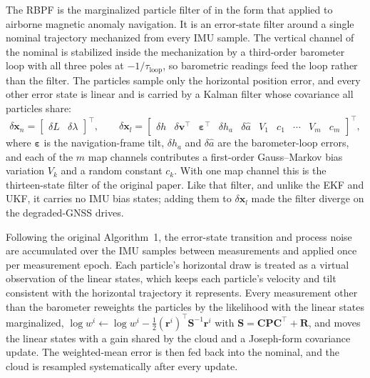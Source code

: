 The RBPF is the marginalized particle filter of \citet{schon2005marginalized} in the form that \citet{canciani2017airborne} applied to airborne magnetic anomaly navigation. It is an error-state filter around a single nominal trajectory mechanized from every IMU sample. The vertical channel of the nominal is stabilized inside the mechanization by a third-order barometer loop with all three poles at \(-1/\tau_\text{loop}\), so barometric readings feed the loop rather than the filter. The particles sample only the horizontal position error, and every other error state is linear and is carried by a Kalman filter whose covariance all particles share:
\begin{equation}
  \delta\mathbf{x}_n = \begin{bmatrix} \delta L & \delta\lambda \end{bmatrix}^\top, \qquad
  \delta\mathbf{x}_l = \begin{bmatrix} \delta h & \delta\mathbf{v}^\top & \bm{\varepsilon}^\top & \delta h_a & \delta\hat{a} & V_1 & c_1 & \cdots & V_m & c_m \end{bmatrix}^\top,
  \label{eqn:rbpf-partition}
\end{equation}
where \(\bm{\varepsilon}\) is the navigation-frame tilt, \(\delta h_a\) and \(\delta\hat{a}\) are the barometer-loop errors, and each of the \(m\) map channels contributes a first-order Gauss--Markov bias variation \(V_k\) and a random constant \(c_k\). With one map channel this is the thirteen-state filter of the original paper. Like that filter, and unlike the EKF and UKF, it carries no IMU bias states; adding them to \(\delta\mathbf{x}_l\) made the filter diverge on the degraded-GNSS drives.

Following the original Algorithm~1, the error-state transition and process noise are accumulated over the IMU samples between measurements and applied once per measurement epoch. Each particle's horizontal draw is treated as a virtual observation of the linear states, which keeps each particle's velocity and tilt consistent with the horizontal trajectory it represents. Every measurement other than the barometer reweights the particles by the likelihood with the linear states marginalized, \(\log w^i \leftarrow \log w^i - \frac{1}{2}(\mathbf{r}^i)^\top\mathbf{S}^{-1}\mathbf{r}^i\) with \(\mathbf{S} = \mathbf{C}\mathbf{P}\mathbf{C}^\top + \mathbf{R}\), and moves the linear states with a gain shared by the cloud and a Joseph-form covariance update. The weighted-mean error is then fed back into the nominal, and the cloud is resampled systematically after every update.

